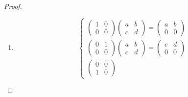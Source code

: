\begin{proof}
\begin{enumerate}[label = (\alph*)]
              Vậy ma trận của tự đồng cấu này đối với cơ sở chính tắc của $M(2\times 2,\mathbb{F})$ là:
              \[
                  \begin{pmatrix}
                      a & 0 & b & 0 \\
                      0 & a & 0 & b \\
                      c & 0 & d & 0 \\
                      0 & c & 0 & d
                  \end{pmatrix}
              \]
        \item
              \[
                  \begin{cases}
                      \begin{pmatrix}
                          1 & 0 \\
                          0 & 0
                      \end{pmatrix}
                      \begin{pmatrix}
                          a & b \\
                          c & d
                      \end{pmatrix}=
                      \begin{pmatrix}
                          a & b \\
                          0 & 0
                      \end{pmatrix} \\
                      \begin{pmatrix}
                          0 & 1 \\
                          0 & 0
                      \end{pmatrix}
                      \begin{pmatrix}
                          a & b \\
                          c & d
                      \end{pmatrix}=
                      \begin{pmatrix}
                          c & d \\
                          0 & 0
                      \end{pmatrix} \\
                      \begin{pmatrix}
                          0 & 0 \\
                          1 & 0
                      \end{pmatrix}

\end{cases}\]
\end{enumerate}
\end{proof}
